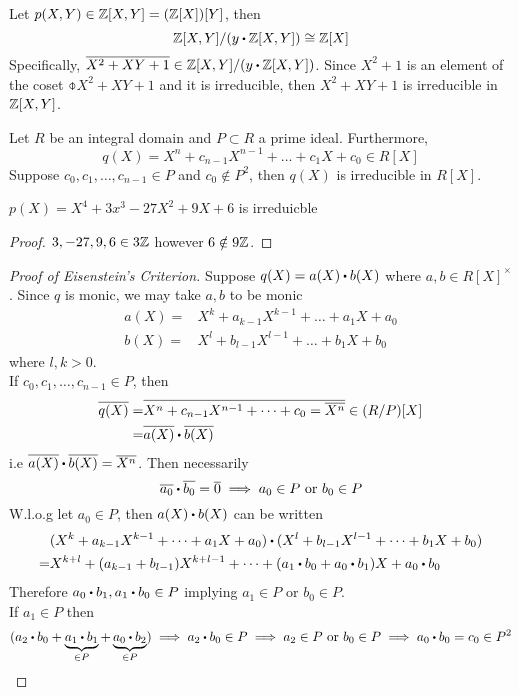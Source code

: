\documentclass[../Main.tex]{subfiles}
\begin{document}
\begin{example}
	Let $p(X,Y)\in \mathbb{Z}[X,Y] = (\mathbb{Z}[X])[Y]$, then
	\[\Z[X,Y]/(y\rdot \Z[X,Y]) \cong \Z[X]\]
	Specifically, $\obar{X^2+XY+1} \in \Z[X,Y]/(y\rdot \Z[X,Y])$. Since $X^2+1$ is an element of the coset $\obar{X^2+XY+1}$ and it is irreducible, then $X^2+XY+1$ is irreducible in $\mathbb{Z}[X,Y]$.
\end{example}
\newpage
\begin{thm}[title= Eisenstein's Criterion,label=eisen]
	Let $R$ be an integral domain and $P\subset R$ a prime ideal. Furthermore,
	\[q(X)=X^n+c_{n-1}X^{n-1}+\dots+c_1X+c_0\in R[X]\]
	Suppose $c_0,c_1,\dots,c_{n-1}\in P$ and $c_0\notin P^2$, then $q(X)$ is irreducible in $R[X]$.
\end{thm}
\begin{claim}
	$p(X) =X^4+3x^3-27X^2+9X+6$ is irreduicble
\end{claim}
\begin{proof}
	$3,-27,9,6\in 3\mathbb{Z}$ however $6\notin 9\mathbb{Z}$.
\end{proof}
\begin{proof}[Proof of Eisenstein's Criterion]
	Suppose $q(X)=a(X)\rdot b(X)$ where $a,b\in R[X]^\times$. Since $q$ is monic, we may take $a,b$ to be monic
	\begin{align*}
	a(X)=&X^k+a_{k-1}X^{k-1}+\dots+a_1X+a_0\\
	b(X)=&X^l+b_{l-1}X^{l-1}+\dots+b_1X+b_0
	\end{align*}
	where $l,k>0$.\\
	If $c_0,c_1,\dots,c_{n-1}\in P$, then
	\begin{align*}
	\obar{q(X)}=&\obar{X^n+c_{n-1}X^{n-1}+\dots+c_0=\obar{X^n}} \in (R/P)[X] \\
	 =&\obar{a(X)}\rdot \obar{b(X)}
	\end{align*}
	i.e $\obar{a(X)}\rdot \obar{b(X)} = \obar{X^n}$. Then necessarily
	\[\obar{a_0}\rdot \obar{b_0}=\obar{0} \implies a_0 \in P \text{ or } b_0\in P\]
	W.l.o.g let $a_0\in P$, then $a(X)\rdot b(X)$ can be written
	\begin{align*}
	&(X^k+a_{k-1}X^{k-1}+\dots+a_1X+a_0)\rdot (X^l+b_{l-1}X^{l-1}+\dots+b_1X+b_0) \\
	=&X^{k+l}+(a_{k-1}+b_{l-1})X^{k+l-1}+\dots+(a_1\rdot b_0+a_0\rdot b_1)X+a_0\rdot b_0
	\end{align*}
	Therefore $a_0\rdot b_1,a_1\rdot b_0\in P$ implying $a_1\in P$ or $b_0\in P$.\\
	If $a_1\in P$ then
	\[(a_2\rdot b_0+\underbrace{a_1\rdot b_1}_{\in P} + \underbrace{a_0\rdot b_2}_{\in P}) \implies a_2\rdot b_0\in P \implies a_2\in P \text{ or } b_0\in P \implies a_0\rdot b_0=c_0\in P^2\]
\end{proof}
\end{document}
